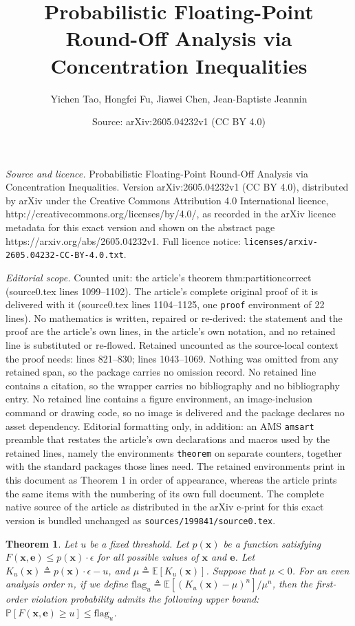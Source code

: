 \documentclass[10pt,a4paper]{amsart}
\title{Probabilistic Floating-Point Round-Off Analysis via Concentration Inequalities}
\author{Yichen Tao, Hongfei Fu, Jiawei Chen, Jean-Baptiste Jeannin}
\date{Source: arXiv:2605.04232v1 (CC BY 4.0)}
\newtheorem{theorem}{Theorem}
\newcommand{\flag}{\mathrm{flag}}
\begin{document}
\maketitle

\noindent\emph{Source and licence.} Probabilistic Floating-Point Round-Off Analysis via Concentration Inequalities. Version arXiv:2605.04232v1 (CC BY 4.0), distributed by arXiv under the Creative Commons Attribution 4.0 International licence, http://creativecommons.org/licenses/by/4.0/, as recorded in the arXiv licence metadata for this exact version and shown on the abstract page https://arxiv.org/abs/2605.04232v1. Full licence notice: \texttt{licenses/arxiv-2605.04232-CC-BY-4.0.txt}.\par\smallskip

\noindent\textit{Editorial scope.} Counted unit: the article's theorem thm:partitioncorrect (source0.tex lines 1099--1102). The article's complete original proof of it is delivered with it (source0.tex lines 1104--1125, one \texttt{proof} environment of 22 lines). No mathematics is written, repaired or re-derived: the statement and the proof are the article's own lines, in the article's own notation, and no retained line is substituted or re-flowed.  Retained uncounted as the source-local context the proof needs: lines 821--830; lines 1043--1069.  Nothing was omitted from any retained span, so the package carries no omission record.  No retained line contains a citation, so the wrapper carries no bibliography and no bibliography entry.  No retained line contains a figure environment, an image-inclusion command or drawing code, so no image is delivered and the package declares no asset dependency.  Editorial formatting only, in addition: an AMS \texttt{amsart} preamble that restates the article's own declarations and macros used by the retained lines, namely the environments \texttt{theorem} on separate counters, together with the standard packages those lines need.  The retained environments print in this document as Theorem 1 in order of appearance, whereas the article prints the same items with the numbering of its own full document.  The complete native source of the article as distributed in the arXiv e-print for this exact version is bundled unchanged as \texttt{sources/199841/source0.tex}.
\begin{theorem}
Let $u$ be a fixed threshold.
Let $p(\mathbf x)$ be a function satisfying $F(\mathbf x, \mathbf e) \le p(\mathbf x) \cdot \epsilon$ for all possible values of $\mathbf x$ and $\mathbf e$.
Let $K_u(\mathbf x)\triangleq p(\mathbf x)\cdot \epsilon - u$, and $\mu \triangleq \mathbb E[K_u(\mathbf x)]$. 
Suppose that $\mu < 0$.
For an even analysis order $n$, if we define
$\flag_u \triangleq {\mathbb E[(K_u(\mathbf x) - \mu)^n]}/{\mu^n}$,
then the first-order violation probability admits the following upper bound: $\mathbb P[F(\mathbf x, \mathbf e) \ge u] \le \flag_u$.
\label{thm:cmb-flag}
\end{theorem}
\end{document}
